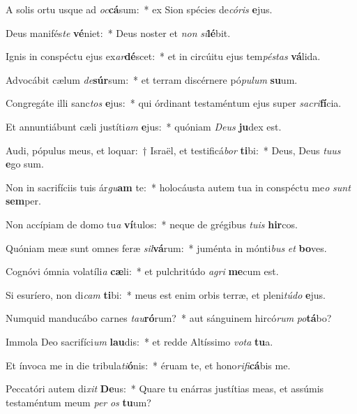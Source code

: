 \item A solis ortu usque ad \textit{oc}\textbf{cá}sum:~* ex Sion spécies de\textit{có}\textit{ris} \textbf{e}jus.
\item Deus manifés\textit{te} \textbf{vé}niet:~* Deus noster et \textit{non} \textit{si}\textbf{lé}bit.
\item Ignis in conspéctu ejus ex\textit{ar}\textbf{dé}scet:~* et in circúitu ejus tem\textit{pés}\textit{tas} \textbf{vá}lida.
\item Advocábit cælum \textit{de}\textbf{súr}sum:~* et terram discérnere pó\textit{pu}\textit{lum} \textbf{su}um.
\item Congregáte illi sanc\textit{tos} \textbf{e}jus:~* qui órdinant testaméntum ejus super \textit{sa}\textit{cri}\textbf{fí}cia.
\item Et annuntiábunt cæli justíti\textit{am} \textbf{e}jus:~* quóniam \textit{De}\textit{us} \textbf{ju}dex est.
\item Audi, pópulus meus, et loquar:~† Israël, et testificá\textit{bor} \textbf{ti}bi:~* Deus, Deus \textit{tu}\textit{us} \textbf{e}go sum.
\item Non in sacrifíciis tuis ár\textit{gu}\textbf{am} te:~* holocáusta autem tua in conspéctu me\textit{o} \textit{sunt} \textbf{sem}per.
\item Non accípiam de domo tu\textit{a} \textbf{ví}tulos:~* neque de grégibus \textit{tu}\textit{is} \textbf{hir}cos.
\item Quóniam meæ sunt omnes feræ \textit{sil}\textbf{vá}rum:~* juménta in mónti\textit{bus} \textit{et} \textbf{bo}ves.
\item Cognóvi ómnia volatíli\textit{a} \textbf{cæ}li:~* et pulchritúdo \textit{a}\textit{gri} \textbf{me}cum est.
\item Si esuríero, non di\textit{cam} \textbf{ti}bi:~* meus est enim orbis terræ, et pleni\textit{tú}\textit{do} \textbf{e}jus.
\item Numquid manducábo carnes \textit{tau}\textbf{ró}rum?~* aut sánguinem hircó\textit{rum} \textit{po}\textbf{tá}bo?
\item Immola Deo sacrifíci\textit{um} \textbf{lau}dis:~* et redde Altíssimo \textit{vo}\textit{ta} \textbf{tu}a.
\item Et ínvoca me in die tribula\textit{ti}\textbf{ó}nis:~* éruam te, et hono\textit{ri}\textit{fi}\textbf{cá}bis me.
\item Peccatóri autem di\textit{xit} \textbf{De}us:~* Quare tu enárras justítias meas, et assúmis testaméntum meum \textit{per} \textit{os} \textbf{tu}um?
